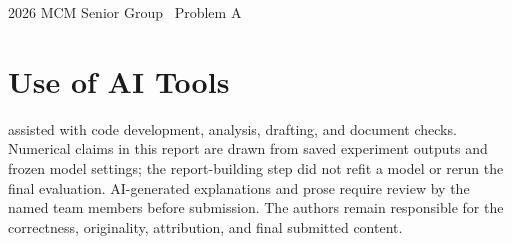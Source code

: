 \documentclass[11pt,a4paper]{article}
\begin{document}
\begin{center}
{\large 2026 MCM Senior Group \textbar\ Problem A}\par
\vspace{6pt}
{\LARGE\bfseries\color{teal}\PaperTitle\par}
\vspace{8pt}
{\PaperAuthors}\par
\PaperTeam\quad\textbar\quad\PaperDate
\end{center}
\vspace{4pt}

\clearpage

\clearpage

\clearpage

\clearpage


\clearpage


\section*{Use of AI Tools}
\AITools{} assisted with code development, analysis, drafting, and document checks. Numerical claims in this report are drawn from saved experiment outputs and frozen model settings; the report-building step did not refit a model or rerun the final evaluation. AI-generated explanations and prose require review by the named team members before submission. The authors remain responsible for the correctness, originality, attribution, and final submitted content.
\end{document}
